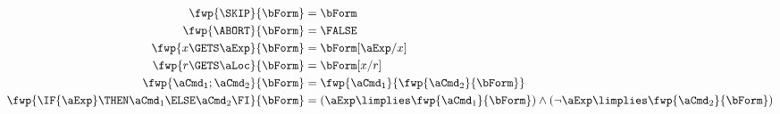 \begin{align*}
  \fwp{\SKIP}{\bForm} &= \bForm
  \\
  \fwp{\ABORT}{\bForm} &= \FALSE
  \\
  \fwp{x\GETS \aExp}{\bForm} &= \bForm[\aExp/x] 
  \\
  \fwp{r\GETS \aLoc}{\bForm} &= \bForm[x/r] 
  \\
  \fwp{\aCmd_1;\aCmd_2}{\bForm} &= \fwp{\aCmd_1}{\fwp{\aCmd_2}{\bForm}}
  \\
  \fwp{\IF{\aExp}\THEN \aCmd_1\ELSE \aCmd_2\FI}{\bForm} &=
  (\aExp\limplies \fwp{\aCmd_1}{\bForm}) \land (\lnot\aExp\limplies \fwp{\aCmd_2}{\bForm})
\end{align*}



